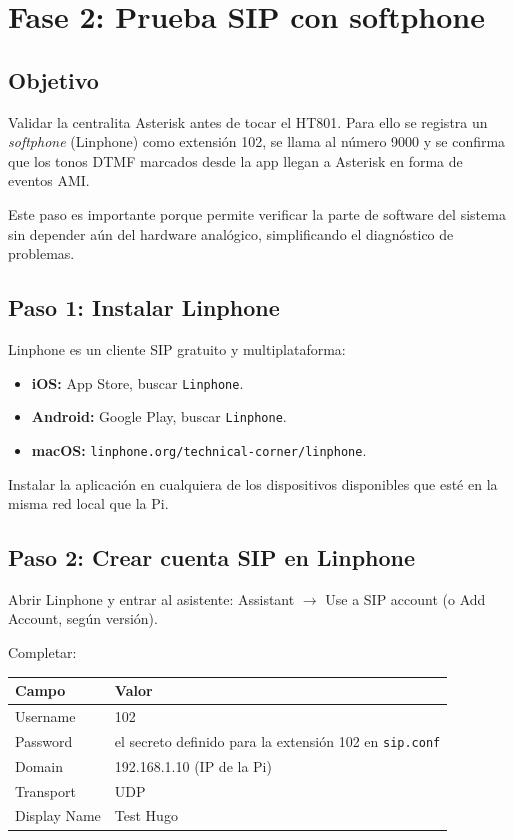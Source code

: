 \chapter{Fase 2: Prueba SIP con softphone}

\section{Objetivo}

Validar la centralita Asterisk antes de tocar el HT801. Para ello se registra un \emph{softphone} (Linphone) como extensión 102, se llama al número 9000 y se confirma que los tonos DTMF marcados desde la app llegan a Asterisk en forma de eventos AMI.

Este paso es importante porque permite verificar la parte de software del sistema sin depender aún del hardware analógico, simplificando el diagnóstico de problemas.

\section{Paso 1: Instalar Linphone}

Linphone es un cliente SIP gratuito y multiplataforma:

\begin{itemize}
  \item \textbf{iOS:} App Store, buscar \texttt{Linphone}.
  \item \textbf{Android:} Google Play, buscar \texttt{Linphone}.
  \item \textbf{macOS:} \texttt{linphone.org/technical-corner/linphone}.
\end{itemize}

Instalar la aplicación en cualquiera de los dispositivos disponibles que esté en la misma red local que la Pi.

\section{Paso 2: Crear cuenta SIP en Linphone}

Abrir Linphone y entrar al asistente: \textsf{Assistant} $\to$ \textsf{Use a SIP account} (o \textsf{Add Account}, según versión).

Completar:

\begin{table}[h]
\centering
\begin{tabular}{ll}
\toprule
\textbf{Campo} & \textbf{Valor} \\
\midrule
Username & 102 \\
Password & el secreto definido para la extensión 102 en \texttt{sip.conf} \\
Domain & 192.168.1.10 (IP de la Pi) \\
Transport & UDP \\
Display Name & Test Hugo \\
\bottomrule
\end{tabular}
\end{table}

